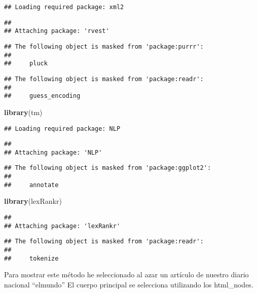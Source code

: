 \documentclass[]{article}
\newenvironment{Shaded}{\begin{snugshade}}{\end{snugshade}}
\newcommand{\KeywordTok}[1]{\textcolor[rgb]{0.13,0.29,0.53}{\textbf{#1}}}
\newcommand{\NormalTok}[1]{#1}
\begin{document}
\begin{verbatim}
## Loading required package: xml2
\end{verbatim}

\begin{verbatim}
## 
## Attaching package: 'rvest'
\end{verbatim}

\begin{verbatim}
## The following object is masked from 'package:purrr':
## 
##     pluck
\end{verbatim}

\begin{verbatim}
## The following object is masked from 'package:readr':
## 
##     guess_encoding
\end{verbatim}

\begin{Shaded}
\begin{Highlighting}[]
\KeywordTok{library}\NormalTok{(tm)}
\end{Highlighting}
\end{Shaded}

\begin{verbatim}
## Loading required package: NLP
\end{verbatim}

\begin{verbatim}
## 
## Attaching package: 'NLP'
\end{verbatim}

\begin{verbatim}
## The following object is masked from 'package:ggplot2':
## 
##     annotate
\end{verbatim}

\begin{Shaded}
\begin{Highlighting}[]
\KeywordTok{library}\NormalTok{(lexRankr)}
\end{Highlighting}
\end{Shaded}

\begin{verbatim}
## 
## Attaching package: 'lexRankr'
\end{verbatim}

\begin{verbatim}
## The following object is masked from 'package:readr':
## 
##     tokenize
\end{verbatim}

Para mostrar este método he seleccionado al azar un artículo de nuestro
diario nacional ``elmundo'' El cuerpo principal se selecciona utilizando
los html\_nodes.
\end{document}
